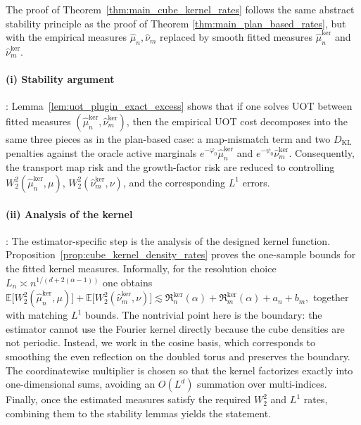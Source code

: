 \documentclass[11pt,reqno]{amsart}
\theoremstyle{definition}
\newcommand{\KL}{\mathrm{KL}}
\renewcommand{\hat}{\widehat}
\newcommand{\Ep}{\mathbb{E}}
\begin{document}
The proof of Theorem~\ref{thm:main_cube_kernel_rates} follows the same abstract stability principle as the proof of Theorem \ref{thm:main_plan_based_rates}, but with the empirical measures $\hat{\mu}_n, \hat{\nu}_m$ replaced by smooth fitted measures $\hat\mu_n^{\mathrm{ker}}$ and $\hat\nu_m^{\mathrm{ker}}$.

\paragraph{(i) Stability argument}: Lemma~\ref{lem:uot_plugin_exact_excess} shows that if one solves UOT between fitted measures $(\hat\mu_n^{\mathrm{ker}},\hat\nu_m^{\mathrm{ker}})$, then the empirical UOT cost decomposes into the same three pieces as in the plan-based case: a map-mismatch term and {two $D_\KL$ penalties} against the oracle active marginals $e^{-\varphi_0}\hat\mu_n^{\mathrm{ker}}$ and $e^{-\psi_0}\hat\nu_m^{\mathrm{ker}}$. Consequently, the transport map risk and the growth-factor risk are reduced to controlling $W_2^2(\hat\mu_n^{\mathrm{ker}},\mu)$, $W_2^2(\hat\nu_m^{\mathrm{ker}},\nu)$, and the corresponding $L^1$ errors.




\paragraph{(ii) Analysis of the kernel}: 
The estimator-specific step is the analysis of the designed kernel function. Proposition~\ref{prop:cube_kernel_density_rates} proves the one-sample bounds for the fitted kernel measures. Informally, for the resolution choice $L_n\asymp n^{1/(d+2(\alpha-1))}$ one obtains
 $   \Ep\bigl[W_2^2(\hat\mu_n^{\mathrm{ker}},\mu)\bigr]
    +
    \Ep\bigl[W_2^2(\hat\nu_m^{\mathrm{ker}},\nu)\bigr]
    \lesssim
    \mathfrak R_n^{\mathrm{ker}}(\alpha)
    +
    \mathfrak R_m^{\mathrm{ker}}(\alpha)
    +
    a_n+b_m,
$
together with matching $L^1$ bounds. The nontrivial point here is the boundary: the estimator cannot use the Fourier kernel directly because the cube densities are not periodic. Instead, we work in the cosine basis, which corresponds to smoothing the even reflection on the doubled torus and preserves the boundary. The coordinatewise multiplier is chosen so that the kernel factorizes exactly into one-dimensional sums, avoiding an $O(L^d)$ summation over multi-indices.
Finally, once the estimated measures satisfy the required $W_2^2$ and $L^1$ rates, combining them to the stability lemmas yields the statement. 
\end{document}

